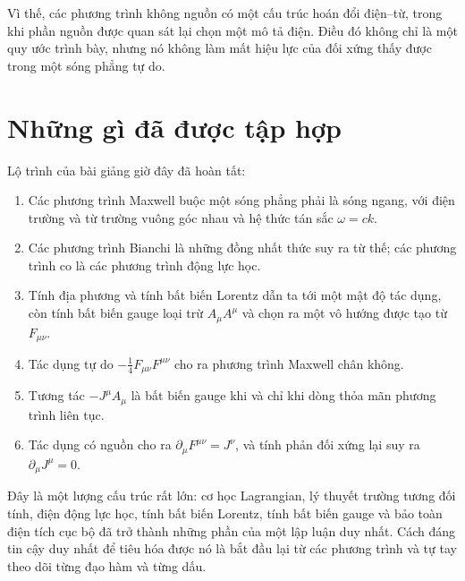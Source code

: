 Vì thế, các phương trình không nguồn có một cấu trúc hoán đổi điện--từ, trong khi phần nguồn được quan sát lại chọn một mô tả điện. Điều đó không chỉ là một quy ước trình bày, nhưng nó không làm mất hiệu lực của đối xứng thấy được trong một sóng phẳng tự do.

\section{Những gì đã được tập hợp}

Lộ trình của bài giảng giờ đây đã hoàn tất:
\begin{enumerate}
\item Các phương trình Maxwell buộc một sóng phẳng phải là sóng ngang, với điện trường và từ trường vuông góc nhau và hệ thức tán sắc
      \(\omega=ck\).
\item Các phương trình Bianchi là những đồng nhất thức suy ra từ thế; các phương trình co là các phương trình động lực học.
\item Tính địa phương và tính bất biến Lorentz dẫn ta tới một mật độ tác dụng, còn tính bất biến gauge loại trừ \(A_\mu A^\mu\) và chọn ra một vô hướng được tạo từ \(F_{\mu\nu}\).
\item Tác dụng tự do
      \(-\tfrac14F_{\mu\nu}F^{\mu\nu}\) cho ra phương trình Maxwell chân không.
\item Tương tác \(-J^\mu A_\mu\) là bất biến gauge khi và chỉ khi dòng thỏa mãn phương trình liên tục.
\item Tác dụng có nguồn cho ra
      \(\partial_\mu F^{\mu\nu}=J^\nu\), và tính phản đối xứng lại suy ra \(\partial_\mu J^\mu=0\).
\end{enumerate}

Đây là một lượng cấu trúc rất lớn: cơ học Lagrangian, lý thuyết trường tương đối tính, điện động lực học, tính bất biến Lorentz, tính bất biến gauge và bảo toàn điện tích cục bộ đã trở thành những phần của một lập luận duy nhất. Cách đáng tin cậy duy nhất để tiêu hóa được nó là bắt đầu lại từ các phương trình và tự tay theo dõi từng đạo hàm và từng dấu.
